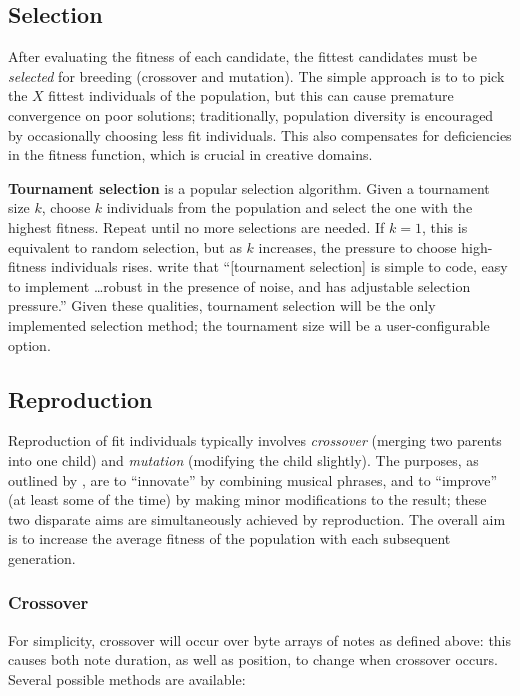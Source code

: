 \subsection{Selection}

After evaluating the fitness of each candidate, the fittest candidates must be \emph{selected} for breeding (crossover and mutation). The simple approach is to to pick the $X$ fittest individuals of the population, but this can cause premature convergence on poor solutions; traditionally, population diversity is encouraged by occasionally choosing less fit individuals. This also compensates for deficiencies in the fitness function, which is crucial in creative domains.

\textbf{Tournament selection} is a popular selection algorithm. Given a tournament size $k$, choose $k$ individuals from the population and select the one with the highest fitness. Repeat until no more selections are needed. If $k=1$, this is equivalent to random selection, but as $k$ increases, the pressure to choose high-fitness individuals rises. \cite{miller96} write that ``[tournament selection] is simple to code, easy to implement \ldots robust in the presence of noise, and has adjustable selection pressure.'' Given these qualities, tournament selection will be the only implemented selection method; the tournament size will be a user-configurable option.

\subsection{Reproduction}
\label{ss-reproduction}

Reproduction of fit individuals typically involves \emph{crossover} (merging two parents into one child) and \emph{mutation} (modifying the child slightly). The purposes, as outlined by \cite{goldberg02}, are to ``innovate'' by combining musical phrases, and to ``improve'' (at least some of the time) by making minor modifications to the result; these two disparate aims are simultaneously achieved by reproduction. The overall aim is to increase the average fitness of the population with each subsequent generation.

\subsubsection{Crossover}

For simplicity, crossover will occur over byte arrays of notes as defined above: this causes both note duration, as well as position, to change when crossover occurs. Several possible methods are available:


